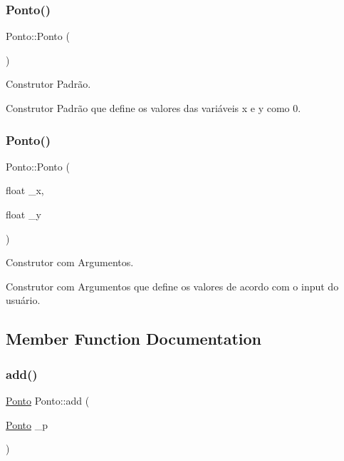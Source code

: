 \subsubsection{\texorpdfstring{Ponto()}{Ponto()}\hspace{0.1cm}{\footnotesize\ttfamily [1/2]}}
{\footnotesize\ttfamily Ponto\+::\+Ponto (\begin{DoxyParamCaption}{ }\end{DoxyParamCaption})}



Construtor Padrão. 

Construtor Padrão que define os valores das variáveis x e y como 0. \mbox{\label{class_ponto_a150e330b2856e42528c4521d575f9179}} 
\subsubsection{\texorpdfstring{Ponto()}{Ponto()}\hspace{0.1cm}{\footnotesize\ttfamily [2/2]}}
{\footnotesize\ttfamily Ponto\+::\+Ponto (\begin{DoxyParamCaption}\item[{float}]{\+\_\+x,  }\item[{float}]{\+\_\+y }\end{DoxyParamCaption})}



Construtor com Argumentos. 

Construtor com Argumentos que define os valores de acordo com o input do usuário. 

\subsection{Member Function Documentation}
\mbox{\label{class_ponto_ab53f257f937ed29a7ed5a1051014773f}} 
\subsubsection{\texorpdfstring{add()}{add()}}
{\footnotesize\ttfamily \mbox{\hyperlink{class_ponto}{Ponto}} Ponto\+::add (\begin{DoxyParamCaption}\item[{\mbox{\hyperlink{class_ponto}{Ponto}}}]{\+\_\+p }\end{DoxyParamCaption})}



